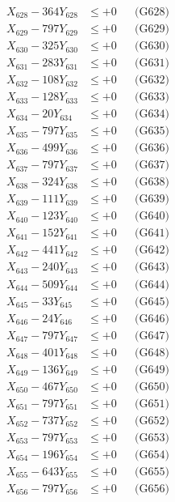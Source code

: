 \documentclass[a4paper,10pt]{article}
\begin{document}
{\begin{align}
X_{628} - 364Y_{628} &\leq +0 && \text{(G628)} \\
X_{629} - 797Y_{629} &\leq +0 && \text{(G629)} \\
X_{630} - 325Y_{630} &\leq +0 && \text{(G630)} \\
\allowbreak
X_{631} - 283Y_{631} &\leq +0 && \text{(G631)} \\
X_{632} - 108Y_{632} &\leq +0 && \text{(G632)} \\
X_{633} - 128Y_{633} &\leq +0 && \text{(G633)} \\
X_{634} - 20Y_{634} &\leq +0 && \text{(G634)} \\
X_{635} - 797Y_{635} &\leq +0 && \text{(G635)} \\
X_{636} - 499Y_{636} &\leq +0 && \text{(G636)} \\
X_{637} - 797Y_{637} &\leq +0 && \text{(G637)} \\
X_{638} - 324Y_{638} &\leq +0 && \text{(G638)} \\
X_{639} - 111Y_{639} &\leq +0 && \text{(G639)} \\
X_{640} - 123Y_{640} &\leq +0 && \text{(G640)} \\
\allowbreak
X_{641} - 152Y_{641} &\leq +0 && \text{(G641)} \\
X_{642} - 441Y_{642} &\leq +0 && \text{(G642)} \\
X_{643} - 240Y_{643} &\leq +0 && \text{(G643)} \\
X_{644} - 509Y_{644} &\leq +0 && \text{(G644)} \\
X_{645} - 33Y_{645} &\leq +0 && \text{(G645)} \\
X_{646} - 24Y_{646} &\leq +0 && \text{(G646)} \\
X_{647} - 797Y_{647} &\leq +0 && \text{(G647)} \\
X_{648} - 401Y_{648} &\leq +0 && \text{(G648)} \\
X_{649} - 136Y_{649} &\leq +0 && \text{(G649)} \\
X_{650} - 467Y_{650} &\leq +0 && \text{(G650)} \\
\allowbreak
X_{651} - 797Y_{651} &\leq +0 && \text{(G651)} \\
X_{652} - 737Y_{652} &\leq +0 && \text{(G652)} \\
X_{653} - 797Y_{653} &\leq +0 && \text{(G653)} \\
X_{654} - 196Y_{654} &\leq +0 && \text{(G654)} \\
X_{655} - 643Y_{655} &\leq +0 && \text{(G655)} \\
X_{656} - 797Y_{656} &\leq +0 && \text{(G656)} \\

\end{align}}
\end{document}
